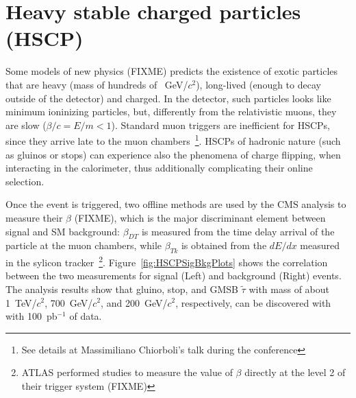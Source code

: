 \documentclass{cimento}
\begin{document}
\section{Heavy stable charged particles (HSCP)} \label{HSCP}
Some models of new physics (FIXME) 
predicts the existence of exotic particles that are 
heavy (mass of hundreds of ~GeV/$c^2$), long-lived
(enough to decay outside of the detector) and charged. 
In the detector, such particles looks like 
minimum ioninizing particles, but, differently from the 
relativistic muons, they are slow ($\beta/c=E/m<1$). 
Standard muon triggers are inefficient for HSCPs, since 
they arrive late to the muon chambers~\footnote{See details 
at Massimiliano Chiorboli's talk during the conference
}. HSCPs of hadronic nature (such as gluinos or stops) 
can experience also the phenomena of charge flipping, when interacting 
in the calorimeter, thus additionally complicating their online selection.

Once the event is triggered, two offline methods are used by the 
CMS analysis to measure their $\beta$ (FIXME), 
which is the major discriminant element between signal and SM background:
$\beta_{DT}$ is measured from the time delay arrival of the particle
at the muon chambers, while $\beta_{Tk}$ is obtained 
from the $dE/dx$ measured in the sylicon
tracker~\footnote{ATLAS performed studies to measure 
the value of $\beta$ directly at the level 2 of their trigger system 
(FIXME)}. Figure~\ref{fig:HSCPSigBkgPlots} 
shows the correlation between the two measurements for signal (Left) 
and background (Right) events. The analysis results show that 
gluino, stop, and GMSB $\tilde{\tau}$  with mass of about 
1~TeV/$c^2$, 700~GeV/$c^2$, and 200~GeV/$c^2$, 
respectively, can be discovered with with 100~pb$^{-1}$ of data.
\end{document}
